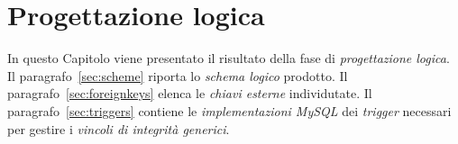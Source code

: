 \chapter{Progettazione logica}
In questo Capitolo viene presentato il risultato della fase di {\it progettazione logica}. %
Il paragrafo~\vref{sec:scheme} riporta lo {\it schema logico} prodotto. Il
paragrafo~\vref{sec:foreignkeys} elenca le {\it chiavi esterne} individutate. Il
paragrafo~\vref{sec:triggers} contiene le {\it implementazioni MySQL}
dei {\it trigger} necessari per gestire i {\it vincoli di integrità generici}.
%



